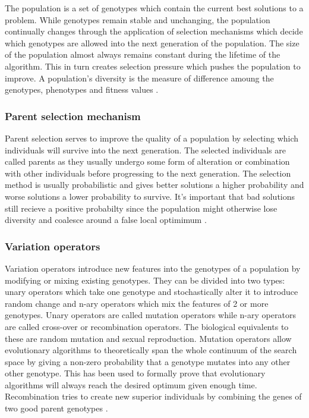 The population is a set of genotypes which contain the current best solutions to a problem. While genotypes remain stable and unchanging, the population continually changes through the application of selection mechanisms which decide which genotypes are allowed into the next generation of the population. The size of the population almost always remains constant during the lifetime of the algorithm. This in turn creates selection pressure which pushes the population to improve. A population's diversity is the measure of difference amoung the genotypes, phenotypes and fitness values \cite{Eiben2015_whatevolutionary}.

\subsubsection{Parent selection mechanism}

Parent selection serves to improve the quality of a population by selecting which individuals will survive into the next generation. The selected individuals are called parents as they usually undergo some form of alteration or combination with other individuals before progressing to the next generation. The selection method is usually probabilistic and gives better solutions a higher probability and worse solutions a lower probability to survive. It's important that bad solutions still recieve a positive probabilty since the population might otherwise lose diversity and coalesce around a false local optimimum \cite{Eiben2015_whatevolutionary}.

\subsubsection{Variation operators}

Variation operators introduce new features into the genotypes of a population by modifying or mixing existing genotypes. They can be divided into two types: unary operators which take one genotype and stochastically alter it to introduce random change and n-ary operators which mix the features of 2 or more genotypes. Unary operators are called mutation operators while n-ary operators are called cross-over or recombination operators. The biological equivalents to these are random mutation and sexual reproduction. Mutation operators allow evolutionary algorithms to theoretically span the whole continuum of the search space by giving a non-zero probability that a genotype mutates into any other other genotype. This has been used to formally prove that evolutionary algorithms will always reach the desired optimum given enough time. Recombination tries to create new superior individuals by combining the genes of two good parent genotypes \cite{Eiben2015_whatevolutionary, Eiben20021}.

